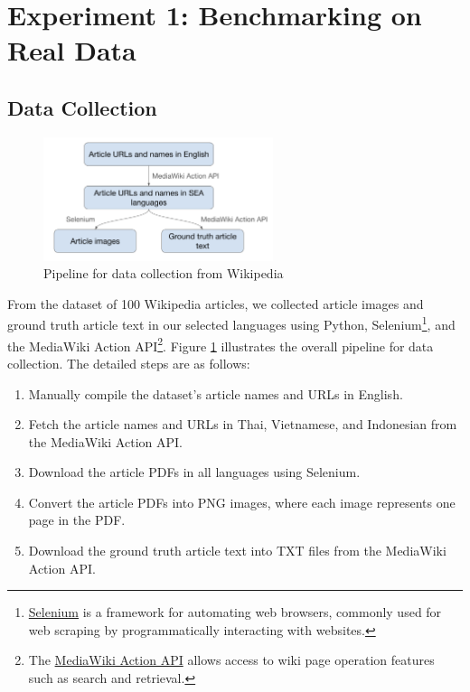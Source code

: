 \documentclass[12pt,oneside]{memoir}
\begin{document}
\section{Experiment 1: Benchmarking on Real Data}

\subsection{Data Collection}

\begin{figure}[ht]
    \centering
    \includegraphics[width=0.6\textwidth]{images/data-collection.png}
    \caption{Pipeline for data collection from Wikipedia}
    \label{figure:data-collection}
\end{figure}

From the dataset of 100 Wikipedia articles, we collected article images and ground 
truth article text in our selected languages using Python, 
Selenium\footnote{\href{https://selenium-python.readthedocs.io}{Selenium} is a 
framework for automating web browsers, commonly used for web scraping by programmatically 
interacting with websites.}, and the MediaWiki Action API\footnote{The \href{https://www.mediawiki.org/wiki/API:Main_page}{MediaWiki Action API} allows 
access to wiki page operation features such as search and retrieval.}. Figure \ref{figure:data-collection} illustrates the overall pipeline 
for data collection. The detailed steps are as follows:

\begin{enumerate}
    \item Manually compile the dataset’s article names and URLs in English.
    \item Fetch the article names and URLs in Thai, Vietnamese, and Indonesian from the MediaWiki Action API.
    \item Download the article PDFs in all languages using Selenium.
    \item Convert the article PDFs into PNG images, where each image represents one page in the PDF.
    \item Download the ground truth article text into TXT files from the MediaWiki Action API.
\end{enumerate}
\end{document}
